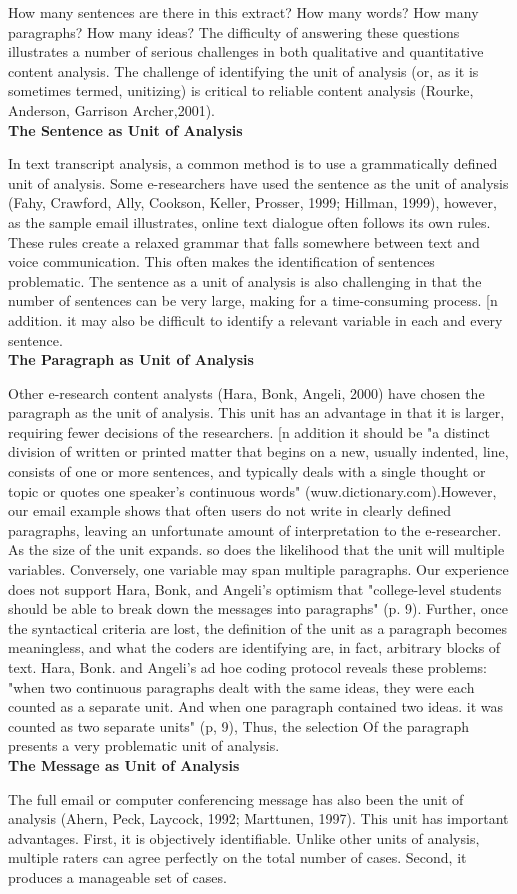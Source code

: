 \documentclass{book}
\begin{document}
How many sentences are there in this extract? How many words? How many paragraphs? How many ideas? The difficulty of answering these questions illustrates a number of serious challenges in both qualitative and quantitative content analysis. The challenge of identifying the unit of analysis (or, as it is sometimes termed, unitizing) is critical to reliable content analysis (Rourke, Anderson, Garrison Archer,2001).\\
\textbf{The Sentence as Unit of Analysis}\par
In text transcript analysis, a common method is to use a grammatically defined unit of analysis. Some e-researchers have used the sentence as the unit of analysis (Fahy, Crawford, Ally, Cookson, Keller, Prosser, 1999; Hillman, 1999), however, as the sample email illustrates, online text dialogue often follows its own rules. These rules create a relaxed grammar that falls somewhere between text and voice communication. This often makes the identification of sentences problematic. The sentence as a unit of analysis is also challenging in that the number of sentences can be very large, making for a time-consuming process. [n addition. it may also be difficult to identify a relevant variable in each and every sentence.\\
\textbf{The Paragraph as Unit of Analysis}\par
Other e-research content analysts (Hara, Bonk, Angeli, 2000) have chosen the paragraph as the unit of analysis. This unit has an advantage in that it is larger, requiring fewer decisions of the researchers. [n addition it should be "a distinct division of written or printed matter that begins on a new, usually indented, line, consists of one or more sentences, and typically deals with a single thought or topic or quotes one speaker's continuous words" (wuw.dictionary.com).However, our email example shows that often users do not write in clearly defined paragraphs, leaving an unfortunate amount of interpretation to the e-researcher. As the size of the unit expands. so does the likelihood that the unit will multiple variables. Conversely, one variable may span multiple paragraphs. Our experience does not support Hara, Bonk, and Angeli's optimism that "college-level students should be able to break down the messages into paragraphs" (p. 9). Further, once the syntactical criteria are lost, the definition of the unit as a paragraph becomes meaningless, and what the coders are identifying are, in fact, arbitrary blocks of text. Hara, Bonk. and Angeli's ad hoe coding protocol reveals these problems: "when two continuous paragraphs dealt with the same ideas, they were each counted as a separate unit. And when one paragraph contained two ideas. it was counted as two separate units" (p, 9), Thus, the selection Of the paragraph presents a very problematic unit of analysis.\\
\textbf{The Message as Unit of Analysis}\par
The full email or computer conferencing message has also been the unit of analysis (Ahern, Peck, Laycock, 1992; Marttunen, 1997). This unit has important advantages. First, it is objectively identifiable. Unlike other units of analysis, multiple raters can agree perfectly on the total number of cases. Second, it produces a manageable set of cases.
\end{document}
